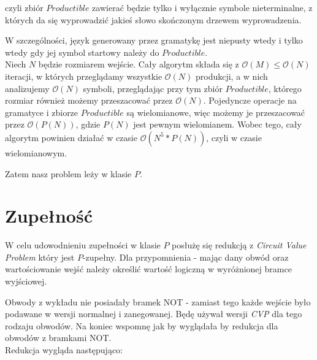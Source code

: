 \documentclass[a4paper,11pt]{article}
\begin{document}
czyli zbiór $Productible$ zawierać będzie tylko i wyłącznie symbole
nieterminalne, z których da się wyprowadzić jakieś słowo skończonym drzewem
wyprowadzenia.

W szczególności, język generowany przez gramatykę jest niepusty wtedy i tylko
wtedy gdy jej symbol startowy należy do $Productible$.\\


Niech $N$ będzie rozmiarem wejście.
Cały algorytm składa się z $\mathcal{O}(M) \leq \mathcal{O}(N) $ iteracji,
w których przeglądamy wszystkie $\mathcal{O}(N)$ produkcji, a w nich analizujemy
$\mathcal{O}(N)$ symboli, przeglądając przy tym zbiór $Productible$, którego
rozmiar również możemy przeszacować przez $\mathcal{O}(N)$.
Pojedyncze operacje na gramatyce i zbiorze $Productible$ są wielomianowe, więc
możemy je przeszacować przez $\mathcal{O}(P(N))$, gdzie $P(N)$ jest pewnym
wielomianem. Wobec tego, cały algorytm powinien działać w czasie 
$\mathcal{O}( N^5 * P(N))$, czyli w czasie wielomianowym.

Zatem nasz problem leży w klasie $P$.

\section*{Zupełność}

W celu udowodnieniu zupełności w klasie $P$ posłużę się redukcją z {\it Circuit
Value Problem} który jest $P$-zupełny. Dla przypomnienia - mając dany obwód oraz
wartościowanie wejść należy określić wartość logiczną w wyróżnionej bramce
wyjściowej.

Obwody z wykładu nie posiadały bramek NOT - zamiast tego każde wejście było
podawane w wersji normalnej i zanegowanej. Będę używał wersji {\it CVP} dla tego
rodzaju obwodów. Na koniec wspomnę jak by wyglądała by redukcja dla obwodów z
bramkami NOT. \\


Redukcja wygląda następująco:\\
\end{document}
